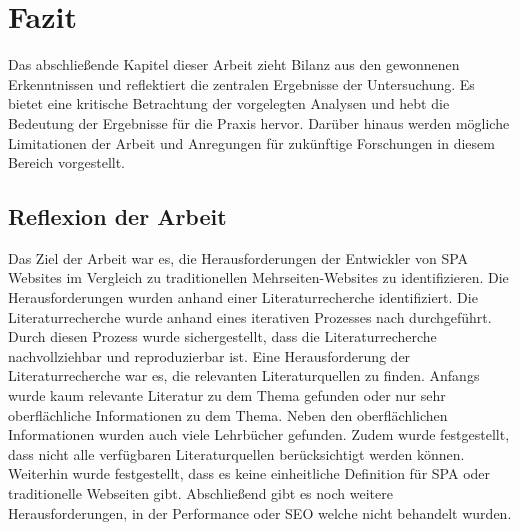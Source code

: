 \section{Fazit}
Das abschließende Kapitel dieser Arbeit zieht Bilanz aus den gewonnenen Erkenntnissen und reflektiert die zentralen Ergebnisse der Untersuchung.
Es bietet eine kritische Betrachtung der vorgelegten Analysen und hebt die Bedeutung der Ergebnisse für die Praxis hervor.
Darüber hinaus werden mögliche Limitationen der Arbeit und Anregungen für zukünftige Forschungen in diesem Bereich vorgestellt.

\subsection{Reflexion der Arbeit}
Das Ziel der Arbeit war es, die Herausforderungen der Entwickler von \ac{SPA} Websites im Vergleich zu traditionellen Mehrseiten-Websites zu identifizieren.
Die Herausforderungen wurden anhand einer Literaturrecherche identifiziert.
Die Literaturrecherche wurde anhand eines iterativen Prozesses nach  durchgeführt.
Durch diesen Prozess wurde sichergestellt, dass die Literaturrecherche nachvollziehbar und reproduzierbar ist.
Eine Herausforderung der Literaturrecherche war es, die relevanten Literaturquellen zu finden.
Anfangs wurde kaum relevante Literatur zu dem Thema gefunden oder nur sehr oberflächliche Informationen zu dem Thema.
Neben den oberflächlichen Informationen wurden auch viele Lehrbücher gefunden.
Zudem wurde festgestellt, dass nicht alle verfügbaren Literaturquellen berücksichtigt werden können.
Weiterhin wurde festgestellt, dass es keine einheitliche Definition für \ac{SPA} oder traditionelle Webseiten gibt.
Abschließend gibt es noch weitere Herausforderungen, in der Performance oder \ac{SEO} welche nicht behandelt wurden.

